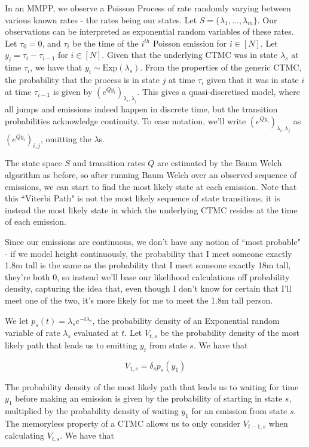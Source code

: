 In an MMPP, we observe a Poisson Process of rate randomly varying between various known rates - the rates being our states. Let $S = \{\lambda_1,...,\lambda_m\}$. Our observations can be interpreted as exponential random variables of these rates. Let $\tau_0 = 0$, and $\tau_i$ be the time of the $i^{th}$ Poisson emission for $i \in [N]$. Let $y_i = \tau_i-\tau_{i-1}$ for $i \in [N]$. Given that the underlying CTMC was in state $\lambda_s$ at time $\tau_i$, we have that $y_i \sim \mathrm{Exp} (\lambda_s)$. From the properties of the generic CTMC, the probability that the process is in state $j$ at time $\tau_i$ given that it was in state $i$ at time $\tau_{i-1}$ is given by $(e^{Qy_i})_{\lambda_{i},\lambda_{j}}$. This gives a quasi-discretised model, where all jumps and emissions indeed happen in discrete time, but the transition probabilities acknowledge continuity. To ease notation, we'll write $(e^{Qy_i})_{\lambda_{i},\lambda_{j}}$ as $(e^{Qy_i})_{i,j}$, omitting the $\lambda$s.

The state space $S$ and transition rates $Q$ are estimated by the Baum Welch algorithm as before, so after running Baum Welch over an observed sequence of emissions, we can start to find the most likely state at each emission. Note that this ``Viterbi Path" is not the most likely sequence of state transitions, it is instead the most likely state in which the underlying CTMC resides at the time of each emission. 

Since our emissions are continuous, we don't have any notion of ``most probable" - if we model height continuously, the probability that I meet someone exactly 1.8m tall is the same as the probability that I meet someone exactly 18m tall, they're both 0, so instead we'll base our likelihood calculations off probability density, capturing the idea that, even though I don't know for certain that I'll meet one of the two, it's more likely for me to meet the 1.8m tall person.

We let $p_s(t)= \lambda_s e^{-t\lambda_s}$, the probability density of an Exponential random variable of rate $\lambda_s$ evaluated at $t$. Let $V_{t,s}$ be the probability density of the most likely path that leads us to emitting $y_t$ from state $s$. We have that

$$
V_{1,s} =  \delta_{s}p_s(y_1)
$$

The probability density of the most likely path that leads us to waiting for time $y_1$ before making an emission is given by the probability of starting in state $s$, multiplied by the probability density of waiting $y_1$ for an emission from state $s$. The memoryless property of a CTMC allows us to only consider $V_{t-1,s}$ when calculating $V_{t,s}$. We have that

